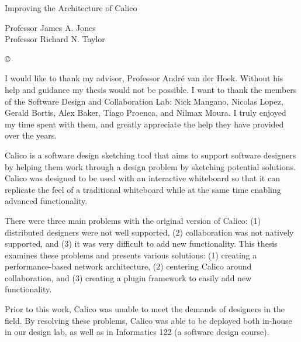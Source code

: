 \documentclass[12pt,fleqn]{ucithesis}
\begin{document}
\thesistitle
{
  Improving the Architecture of Calico
}




\othercommitteemembers
{
  Professor James A. Jones\\
  Professor Richard N. Taylor
}


\copyrightdeclaration
{
  {\copyright} {\Degreeyear} \Authorname
}



\acknowledgments
{
  I would like to thank my advisor, Professor Andr\'{e} van der Hoek. Without his help and guidance my thesis would not be possible.
  I want to thank the members of the Software Design and Collaboration Lab: Nick Mangano, Nicolas Lopez, Gerald Bortis, Alex Baker, Tiago Proenca, and Nilmax Moura. I truly enjoyed my time spent with them, and greatly appreciate the help they have provided over the years.
}

\thesisabstract
{
  Calico is a software design sketching tool that aims to support software designers by helping them work through a design problem by sketching potential solutions. 
  Calico was designed to be used with an interactive whiteboard so that it can replicate the feel of a traditional whiteboard while at the same time enabling advanced functionality. 

  There were three main problems with the original version of Calico: 
  (1) distributed designers were not well supported, 
  (2) collaboration was not natively supported,
  and (3) it was very difficult to add new functionality.
  This thesis examines these problems and presents various solutions:
  (1) creating a performance-based network architecture,
  (2) centering Calico around collaboration,
  and (3) creating a plugin framework to easily add new functionality.

  Prior to this work, Calico was unable to meet the demands of designers in the field. By resolving these problems, Calico was able to be deployed both in-house in our design lab, as well as in Informatics 122 (a software design course).
}
\end{document}
